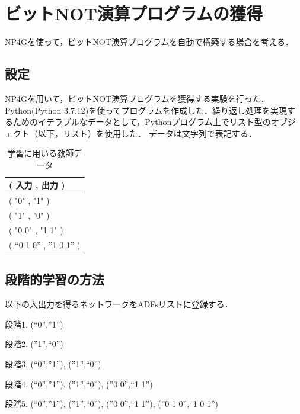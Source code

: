 \documentclass[exploratorypaper]{jsaiart} %
\begin{document}
\section{ビットNOT演算プログラムの獲得}
NP4Gを使って，ビットNOT演算プログラムを自動で構築する場合を考える．

\subsection{設定}
NP4Gを用いて，ビットNOT演算プログラムを獲得する実験を行った．
Python(Python 3.7.12)を使ってプログラムを作成した．繰り返し処理を実現するためのイテラブルなデータとして，Pythonプログラム上でリスト型のオブジェクト（以下，リスト）を使用した．
データは文字列で表記する．

\begin{table}[htbp]
\centering
\caption{学習に用いる教師データ}
\label{tbl:result}
\begin{tabular}{l}
    \hline
     ( 入力 , 出力 ) \\
    \hline \hline
    ( "0" , "1" ) \\
    ( "1" , "0" ) \\
    ( "0 0" , "1 1" ) \\
    ( “0 1 0” , ”1 0 1” ) \\
    \hline
\end{tabular}
\end{table}

\subsection{段階的学習の方法}
以下の入出力を得るネットワークをADFsリストに登録する．






段階1. (“0”,”1”)

段階2. (”1”,“0”)

段階3. (“0”,”1”), (”1”,“0”)

段階4. (“0”,”1”), (”1”,“0”), (”0 0”,“1 1”)

段階5. (“0”,”1”), (”1”,“0”), (”0 0”,“1 1”), (”0 1 0”,“1 0 1”)
\end{document}
